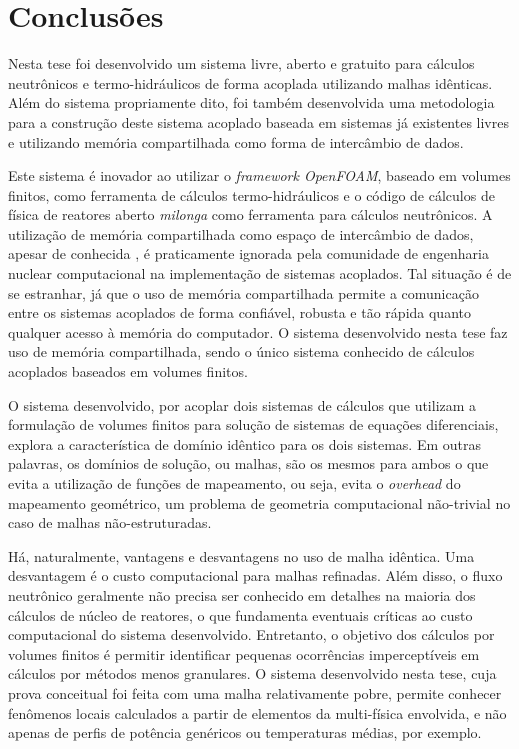 \chapter{Conclusões}
\label{chap:conclusoes}

Nesta tese foi desenvolvido um sistema livre, aberto e gratuito para
cálculos neutrônicos e termo-hidráulicos de forma acoplada utilizando
malhas idênticas. Além do sistema propriamente dito, foi também desenvolvida
uma metodologia para a construção deste sistema acoplado baseada em sistemas
já existentes livres e utilizando memória compartilhada como forma de
intercâmbio de dados.

Este sistema é inovador ao utilizar o \textit{framework OpenFOAM}, baseado
em volumes finitos, como ferramenta de cálculos termo-hidráulicos e o
código de cálculos de física de reatores aberto \textit{milonga} como ferramenta
para cálculos neutrônicos. A utilização de memória compartilhada como
espaço de intercâmbio de dados, apesar de conhecida \cite{Maciel2011, Theler2013},
é praticamente ignorada pela comunidade de engenharia nuclear computacional na
implementação de sistemas acoplados. Tal situação é de se estranhar, já que o
uso de memória compartilhada permite a comunicação entre os sistemas acoplados
de forma confiável, robusta e tão rápida quanto qualquer acesso à memória
do computador. O sistema desenvolvido nesta tese faz uso de memória compartilhada,
sendo o único sistema conhecido de cálculos acoplados baseados em volumes finitos. 

O sistema desenvolvido, por acoplar dois sistemas de cálculos que utilizam
a formulação de volumes finitos para solução de sistemas de equações diferenciais,
explora a característica de domínio idêntico para os dois sistemas. Em outras palavras,
os domínios de solução, ou malhas, são os mesmos para ambos o que evita a utilização
de funções de mapeamento, ou seja, evita o \textit{overhead} do mapeamento geométrico,
um problema de geometria computacional não-trivial no caso de malhas não-estruturadas.

Há, naturalmente, vantagens e desvantagens no uso de malha idêntica. Uma desvantagem
é o custo computacional para malhas refinadas. Além disso, o fluxo neutrônico geralmente
não precisa ser conhecido em detalhes na maioria dos cálculos de núcleo de reatores,
o que fundamenta eventuais críticas ao custo computacional do sistema desenvolvido. 
Entretanto, o objetivo dos cálculos por volumes
finitos é permitir identificar pequenas ocorrências imperceptíveis
em cálculos por métodos menos granulares. O sistema desenvolvido nesta tese, cuja
prova conceitual foi feita com uma malha relativamente pobre, permite conhecer fenômenos
locais calculados a partir de elementos da multi-física envolvida, e não apenas
de perfis de potência genéricos ou temperaturas médias, por exemplo. 

